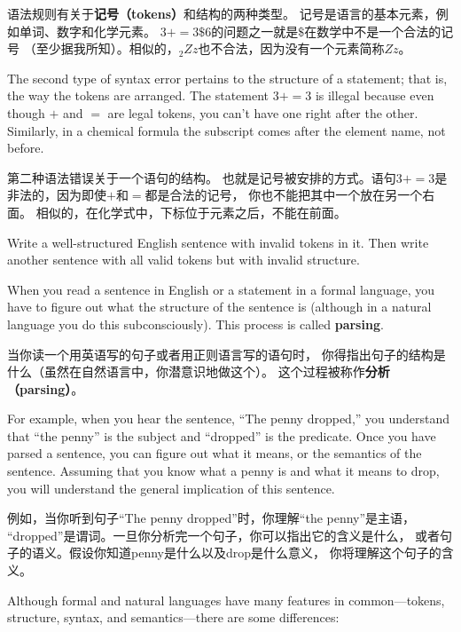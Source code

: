 \documentclass[10pt]{book}
\begin{document}
\begin{CJK}{UTF8}{gbsn}
语法规则有关于{\bf 记号（tokens）}和结构的两种类型。
记号是语言的基本元素，例如单词、数字和化学元素。
$3 + = 3 \mbox{\$} 6$的问题之一就是\( \$ \)在数学中不是一个合法的记号
（至少据我所知）。相似的，$_2Zz$也不合法，因为没有一个元素简称$Zz$。

The second type of syntax error pertains to the structure of a
statement; that is, the way the tokens are arranged.  The statement
$3 + = 3$ is illegal because even though $+$ and $=$ are
legal tokens, you can't have one right after the other.  Similarly,
in a chemical formula the subscript comes after the element name, not
before.

第二种语法错误关于一个语句的结构。
也就是记号被安排的方式。语句$3 + = 3$是非法的，因为即使$+$和$=$都是合法的记号，
你也不能把其中一个放在另一个右面。
相似的，在化学式中，下标位于元素之后，不能在前面。

\begin{exercise}

Write a well-structured English
sentence with invalid tokens in it.  Then write another sentence
with all valid tokens but with invalid structure.

\end{exercise}

When you read a sentence in English or a statement in a formal
language, you have to figure out what the structure of the sentence is
(although in a natural language you do this subconsciously).  This
process is called {\bf parsing}.

当你读一个用英语写的句子或者用正则语言写的语句时，
你得指出句子的结构是什么（虽然在自然语言中，你潜意识地做这个）。
这个过程被称作{\bf 分析（parsing）}。

For example, when you hear the sentence, ``The penny dropped,'' you
understand that ``the penny'' is the subject and ``dropped'' is the
predicate.  Once you have parsed a sentence, you can figure out what it
means, or the semantics of the sentence.  Assuming that you know
what a penny is and what it means to drop, you will understand the
general implication of this sentence.

例如，当你听到句子``The penny dropped''时，你理解``the penny''是主语，
``dropped''是谓词。一旦你分析完一个句子，你可以指出它的含义是什么，
或者句子的语义。假设你知道penny是什么以及drop是什么意义，
你将理解这个句子的含义。

Although formal and natural languages have many features in
common---tokens, structure, syntax, and semantics---there are some
differences:


\end{CJK}
\end{document}
